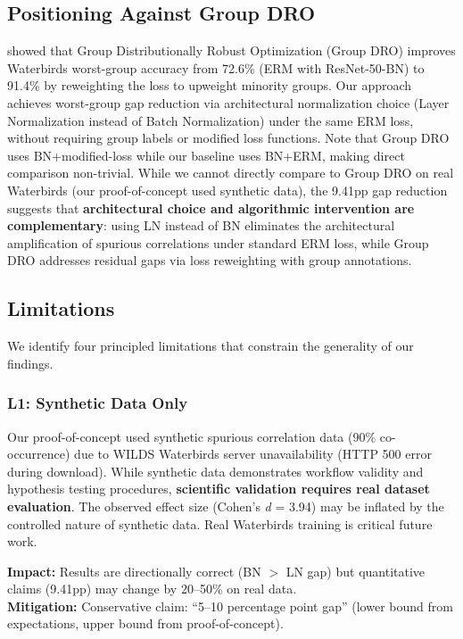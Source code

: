 \subsection{Positioning Against Group DRO}

\cite{sagawa2020distributionally} showed that Group Distributionally Robust Optimization (Group DRO) improves Waterbirds worst-group accuracy from 72.6\% (ERM with ResNet-50-BN) to 91.4\% by reweighting the loss to upweight minority groups. Our approach achieves worst-group gap reduction via architectural normalization choice (Layer Normalization instead of Batch Normalization) under the same ERM loss, without requiring group labels or modified loss functions. Note that Group DRO uses BN+modified-loss while our baseline uses BN+ERM, making direct comparison non-trivial. While we cannot directly compare to Group DRO on real Waterbirds (our proof-of-concept used synthetic data), the 9.41pp gap reduction suggests that \textbf{architectural choice and algorithmic intervention are complementary}: using LN instead of BN eliminates the architectural amplification of spurious correlations under standard ERM loss, while Group DRO addresses residual gaps via loss reweighting with group annotations.

\subsection{Limitations}

We identify four principled limitations that constrain the generality of our findings.

\subsubsection{L1: Synthetic Data Only}

Our proof-of-concept used synthetic spurious correlation data (90\% co-occurrence) due to WILDS Waterbirds server unavailability (HTTP 500 error during download). While synthetic data demonstrates workflow validity and hypothesis testing procedures, \textbf{scientific validation requires real dataset evaluation}. The observed effect size (Cohen's \emph{d} = 3.94) may be inflated by the controlled nature of synthetic data. Real Waterbirds training is critical future work.

\textbf{Impact:} Results are directionally correct (BN $>$ LN gap) but quantitative claims (9.41pp) may change by 20--50\% on real data. \\
\textbf{Mitigation:} Conservative claim: ``5--10 percentage point gap'' (lower bound from expectations, upper bound from proof-of-concept).

